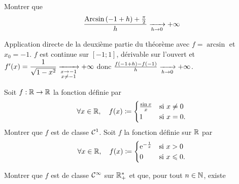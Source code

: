 \documentclass{magnoliaold}
\begin{document}
\begin{exos}
\exo Montrer que
  \[\frac{\operatorname{Arcsin}\left(-1+h\right)+\frac{\pi}{2}}{h}\xrightarrow[h\rightarrow 0]{}+\infty\]
  \begin{sol}
    Application directe de la deuxième partie du théorème avec $f=\arcsin$ et $x_0=-1$.
    $f$ est continue sur $[-1;1]$, dérivable sur l'ouvert et $f'(x)=\dfrac{1}{\sqrt{1-x^2}}\xrightarrow[ \substack{x\rightarrow -1 \\ x\not=-1}]{}+\infty$ donc $\frac{f(-1+h)-f(-1)}{h}\xrightarrow[h\rightarrow 0]{}+\infty$.
    \end{sol}
\exo Soit $f:\mathbb{R}\to\mathbb{R}$ la fonction définie par
  \[\forall x\in\mathbb{R},\quad f(x)\coloneqq
    \begin{cases}
    \frac{\sin x}{x} & \text{si $x\neq 0$}\\
    1 & \text{si $x=0$.}
    \end{cases}\]
  Montrer que $f$ est de classe $\mathcal{C}^{1}$.
\exo Soit $f$ la fonction définie sur $\mathbb{R}$ par
  \[\forall x\in\mathbb{R} ,\quad f(x)\coloneqq
    \begin{cases}
    {\rm e}^{-\frac{1}{x}} & \text{si $x> 0$}\\
    0 & \text{si $x\leqslant 0$.}
    \end{cases}\]
  \begin{questions}
\question Montrer que $f$ est de classe $\mathcal{C}^{\infty}$ sur $\mathbb{R}_+^*$ et que, pour tout $n\in\mathbb{N}$, existe

\end{questions}
\end{exos}
\end{document}
